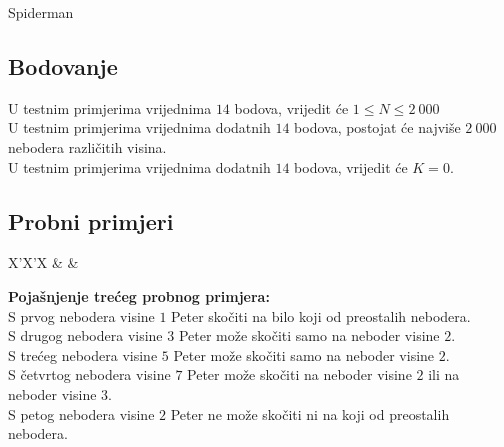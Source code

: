 \begin{statement}[
  problempoints=70,
  timelimit=1 sekunda,
  memorylimit=512 MiB,
]{Spiderman}
\subsection*{Bodovanje}
U testnim primjerima vrijednima $14$ bodova, vrijedit će $1 \le N \le 2\ 000$\\
U testnim primjerima vrijednima dodatnih $14$ bodova, postojat će najviše $2\ 000$
nebodera različitih visina.\\
U testnim primjerima vrijednima dodatnih $14$ bodova, vrijedit će $K = 0$.

\subsection*{Probni primjeri}
\begin{tabularx}{\textwidth}{X'X'X}
 &
 &
\end{tabularx}

\textbf{Pojašnjenje trećeg probnog primjera:}\\
S prvog nebodera visine $1$ Peter skočiti na bilo koji od preostalih nebodera.\\
S drugog nebodera visine $3$ Peter može skočiti samo na neboder visine $2$.\\
S trećeg nebodera visine $5$ Peter može skočiti samo na neboder visine $2$.\\
S četvrtog nebodera visine $7$ Peter može skočiti na neboder visine $2$ ili na neboder visine $3$.\\
S petog nebodera visine $2$ Peter ne može skočiti ni na koji od preostalih nebodera.

\end{statement}

